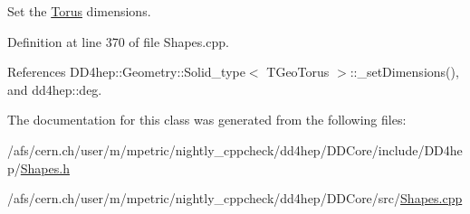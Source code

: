 Set the \hyperlink{class_d_d4hep_1_1_geometry_1_1_torus}{Torus} dimensions. 

Definition at line 370 of file Shapes.cpp.

References DD4hep::Geometry::Solid\_\-type$<$ TGeoTorus $>$::\_\-setDimensions(), and dd4hep::deg.

The documentation for this class was generated from the following files:\begin{DoxyCompactItemize}
\item 
/afs/cern.ch/user/m/mpetric/nightly\_\-cppcheck/dd4hep/DDCore/include/DD4hep/\hyperlink{_shapes_8h}{Shapes.h}\item 
/afs/cern.ch/user/m/mpetric/nightly\_\-cppcheck/dd4hep/DDCore/src/\hyperlink{_shapes_8cpp}{Shapes.cpp}\end{DoxyCompactItemize}
